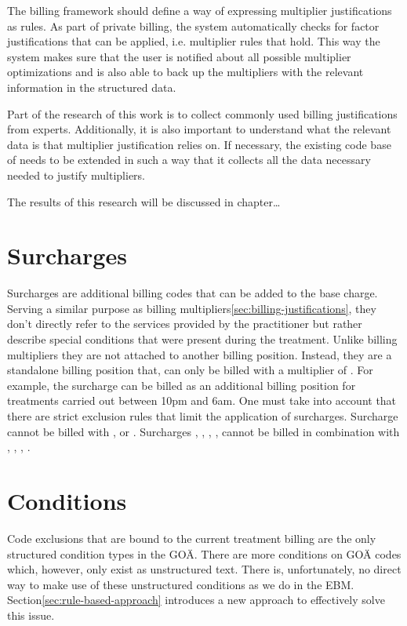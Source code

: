 The billing framework should define a way of expressing multiplier justifications as rules.
As part of private billing, the system automatically checks for factor justifications that can be applied, i.e. multiplier rules that hold.
This way the system makes sure that the user is notified about all possible multiplier optimizations and is also able to back up the multipliers with the relevant information in the structured data.

Part of the research of this work is to collect commonly used billing justifications from experts.
Additionally, it is also important to understand what the relevant data is that multiplier justification relies on.
If necessary, the existing code base of \AV needs to be extended in such a way that it collects all the data necessary needed to justify multipliers.

The results of this research will be discussed in chapter\ldots


\section{Surcharges}\label{sec:surcharges}
Surcharges are additional billing codes that can be added to the base charge.
Serving a similar purpose as billing multipliers\ref{sec:billing-justifications}, they don't directly refer to the services provided by the practitioner but rather describe special conditions that were present during the treatment\cite{walter2008abrechnung}.
Unlike billing multipliers they are not attached to another billing position.
Instead, they are a standalone billing position that, can only be billed with a multiplier of .
For example, the surcharge  can be billed as an additional billing position for treatments carried out between 10pm and 6am.
One must take into account that there are strict exclusion rules that limit the application of surcharges\cite{kommentar2012zuschlage}.
Surcharge  cannot be billed with ,  or .
Surcharges , , , ,  cannot be billed in combination with , , , \cite{kommentar2012zuschlage}.

\section{Conditions}\label{sec:goae-conditions}
Code exclusions that are bound to the current treatment billing are the only structured condition types in the GOÄ.
There are more conditions on GOÄ codes which, however, only exist as unstructured text.
There is, unfortunately, no direct way to make use of these unstructured conditions as we do in the EBM.
Section\ref{sec:rule-based-approach} introduces a new approach to effectively solve this issue.